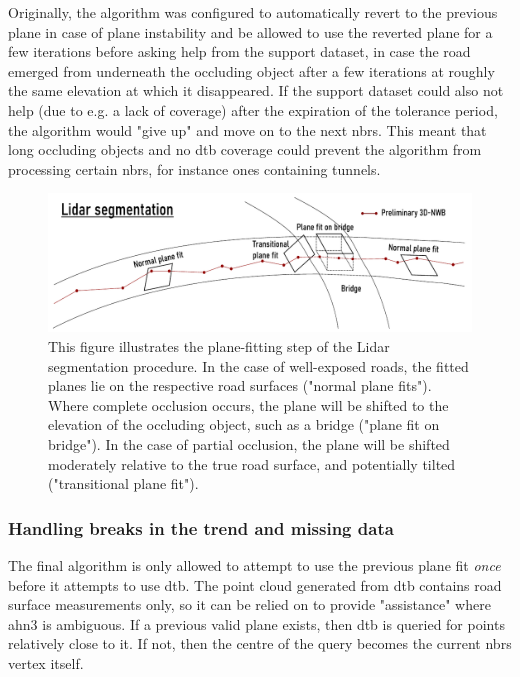 Originally, the algorithm was configured to automatically revert to the previous plane in case of plane instability and be allowed to use the reverted plane for a few iterations before asking help from the support dataset, in case the road emerged from underneath the occluding object after a few iterations at roughly the same elevation at which it disappeared. If the support dataset could also not help (due to e.g. a lack of coverage) after the expiration of the tolerance period, the algorithm would "give up" and move on to the next \ac{nbrs}. This meant that long occluding objects and no \ac{dtb} coverage could prevent the algorithm from processing certain \ac{nbrs}, for instance ones containing tunnels.

\begin{figure}
    \centering
    \includegraphics[width=\linewidth]{final_report/figs/lidar_segmentation_illu.pdf}
    \caption[Illustration of the Lidar segmentation step]{This figure illustrates the plane-fitting step of the Lidar segmentation procedure. In the case of well-exposed roads, the fitted planes lie on the respective road surfaces ("normal plane fits"). Where complete occlusion occurs, the plane will be shifted to the elevation of the occluding object, such as a bridge ("plane fit on bridge"). In the case of partial occlusion, the plane will be shifted moderately relative to the true road surface, and potentially tilted ("transitional plane fit").}
    \label{fig:lidarsegmentation_illu}
\end{figure}

\subsubsection{Handling breaks in the trend and missing data}

The final algorithm is only allowed to attempt to use the previous plane fit \textit{once} before it attempts to use \ac{dtb}. The point cloud generated from \ac{dtb} contains road surface measurements only, so it can be relied on to provide "assistance" where \ac{ahn3} is ambiguous. If a previous valid plane exists, then \ac{dtb} is queried for points relatively close to it. If not, then the centre of the query becomes the current \ac{nbrs} vertex itself.

